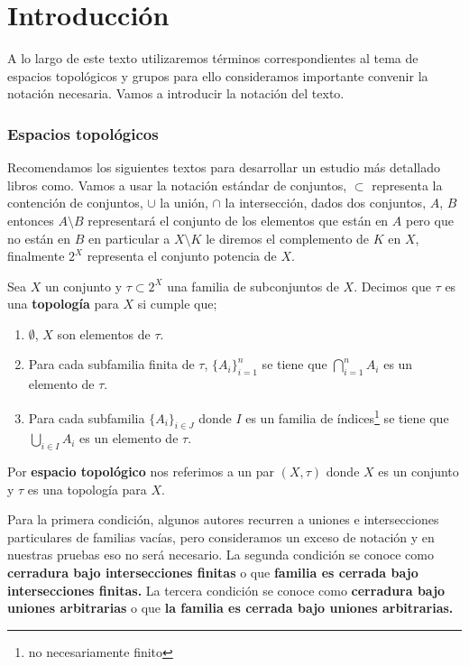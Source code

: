 
	

	


	
\chapter{Introducción}

A lo largo de este texto utilizaremos términos correspondientes al tema de espacios topológicos y grupos para ello consideramos importante convenir la notación necesaria. Vamos a introducir la notación  del texto.

\subsection*{Espacios topológicos}

 Recomendamos los siguientes textos para desarrollar un estudio más detallado libros como. Vamos a usar la notación estándar de conjuntos, $\subset$ representa la contención de conjuntos, $\cup$ la unión, $\cap$ la intersección, dados dos conjuntos, $A$, $B$ entonces $A \setminus B$ representará el conjunto de los elementos que están en $A$ pero que no están en $B$ en particular a $X\setminus K$ le diremos el complemento de $K$ en $X$,  finalmente $2^X$ representa el conjunto potencia de $X$. 

\begin{df}
Sea $X$ un conjunto y $\tau \subset 2^X$ una familia de subconjuntos de $X$. Decimos que $\tau$ es una \textbf{topología} para $X$ si cumple que;
	\begin{enumerate}
		\item $\emptyset$, $X$ son elementos de  $\tau.$
		\item Para cada subfamilia finita de $\tau$, $\{A_i\}_{i=1}^n$ se tiene que $\bigcap_{i=1}^n A_i$ es un elemento de $\tau.$ 
		\item Para cada subfamilia $\{A_i\}_{i \in J}$ donde $I$ es un familia de índices\footnote{no necesariamente finito} se tiene que $\bigcup_{i \in I} A_i$ es un elemento de $\tau$.
	\end{enumerate}

 Por \textbf{espacio topológico} nos referimos a un par $(X,\tau)$ donde $X$ es un conjunto y $\tau$ es una topología para $X$.
\end{df}

\begin{ob}
Para la primera condición, algunos autores recurren a uniones e intersecciones particulares de familias vacías, pero consideramos un exceso de notación y en nuestras pruebas eso no será necesario. La segunda condición se conoce como \textbf{cerradura bajo intersecciones finitas} o que \textbf{familia es cerrada bajo intersecciones finitas.} La tercera condición se conoce como \textbf{cerradura bajo uniones arbitrarias} o que \textbf{la familia es cerrada bajo uniones arbitrarias.}
\end{ob}


